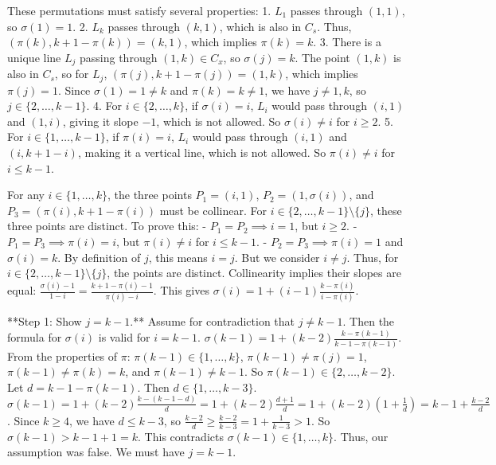 \documentclass[12pt]{article}
\begin{document}
    These permutations must satisfy several properties:
    1.  $L_1$ passes through $(1,1)$, so $\sigma(1)=1$.
    2.  $L_k$ passes through $(k,1)$, which is also in $C_s$. Thus, $(\pi(k), k+1-\pi(k))=(k,1)$, which implies $\pi(k)=k$.
    3.  There is a unique line $L_j$ passing through $(1,k) \in C_x$, so $\sigma(j)=k$. The point $(1,k)$ is also in $C_s$, so for $L_j$, $(\pi(j), k+1-\pi(j))=(1,k)$, which implies $\pi(j)=1$. Since $\sigma(1)=1 \ne k$ and $\pi(k)=k \ne 1$, we have $j \ne 1,k$, so $j \in \{2, \dots, k-1\}$.
    4.  For $i \in \{2, \dots, k\}$, if $\sigma(i)=i$, $L_i$ would pass through $(i,1)$ and $(1,i)$, giving it slope $-1$, which is not allowed. So $\sigma(i) \ne i$ for $i \ge 2$.
    5.  For $i \in \{1, \dots, k-1\}$, if $\pi(i)=i$, $L_i$ would pass through $(i,1)$ and $(i, k+1-i)$, making it a vertical line, which is not allowed. So $\pi(i) \ne i$ for $i \le k-1$.

    For any $i \in \{1, \dots, k\}$, the three points $P_1=(i,1)$, $P_2=(1, \sigma(i))$, and $P_3=(\pi(i), k+1-\pi(i))$ must be collinear. For $i \in \{2, \dots, k-1\} \setminus \{j\}$, these three points are distinct. To prove this:
    - $P_1=P_2 \implies i=1$, but $i \ge 2$.
    - $P_1=P_3 \implies \pi(i)=i$, but $\pi(i) \ne i$ for $i \le k-1$.
    - $P_2=P_3 \implies \pi(i)=1$ and $\sigma(i)=k$. By definition of $j$, this means $i=j$. But we consider $i \ne j$.
    Thus, for $i \in \{2, \dots, k-1\} \setminus \{j\}$, the points are distinct. Collinearity implies their slopes are equal: $\frac{\sigma(i)-1}{1-i} = \frac{k+1-\pi(i)-1}{\pi(i)-i}$. This gives $\sigma(i) = 1 + (i-1)\frac{k-\pi(i)}{i-\pi(i)}$.

    **Step 1: Show $j=k-1$.**
    Assume for contradiction that $j \ne k-1$. Then the formula for $\sigma(i)$ is valid for $i=k-1$.
    $\sigma(k-1) = 1 + (k-2)\frac{k-\pi(k-1)}{k-1-\pi(k-1)}$.
    From the properties of $\pi$: $\pi(k-1) \in \{1, \dots, k\}$, $\pi(k-1) \ne \pi(j)=1$, $\pi(k-1) \ne \pi(k)=k$, and $\pi(k-1) \ne k-1$. So $\pi(k-1) \in \{2, \dots, k-2\}$.
    Let $d = k-1-\pi(k-1)$. Then $d \in \{1, \dots, k-3\}$.
    $\sigma(k-1) = 1 + (k-2)\frac{k-(k-1-d)}{d} = 1 + (k-2)\frac{d+1}{d} = 1+(k-2)(1+\frac{1}{d}) = k-1 + \frac{k-2}{d}$.
    Since $k \ge 4$, we have $d \le k-3$, so $\frac{k-2}{d} \ge \frac{k-2}{k-3} = 1+\frac{1}{k-3} > 1$.
    So $\sigma(k-1) > k-1+1=k$. This contradicts $\sigma(k-1) \in \{1, \dots, k\}$.
    Thus, our assumption was false. We must have $j=k-1$.
\end{document}
